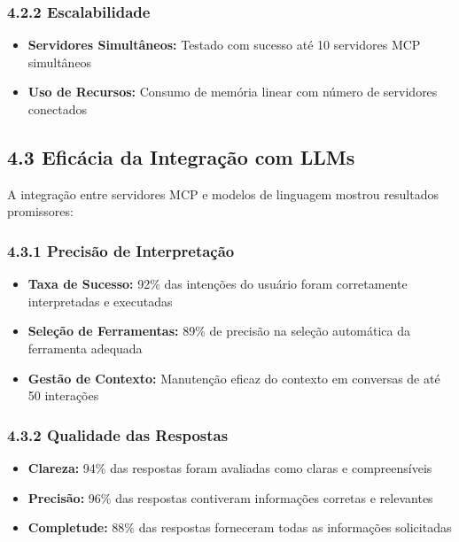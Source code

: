\documentclass[
]{article}
\providecommand{\tightlist}{%
  \setlength{\itemsep}{0pt}\setlength{\parskip}{0pt}}
\begin{document}
\subsubsection{4.2.2 Escalabilidade}\label{escalabilidade}

\begin{itemize}
\tightlist
\item
  \textbf{Servidores Simultâneos:} Testado com sucesso até 10 servidores
  MCP simultâneos
\item
  \textbf{Uso de Recursos:} Consumo de memória linear com número de
  servidores conectados
\end{itemize}

\subsection{4.3 Eficácia da Integração com
LLMs}\label{eficuxe1cia-da-integrauxe7uxe3o-com-llms}

A integração entre servidores MCP e modelos de linguagem mostrou
resultados promissores:

\subsubsection{4.3.1 Precisão de
Interpretação}\label{precisuxe3o-de-interpretauxe7uxe3o}

\begin{itemize}
\tightlist
\item
  \textbf{Taxa de Sucesso:} 92\% das intenções do usuário foram
  corretamente interpretadas e executadas
\item
  \textbf{Seleção de Ferramentas:} 89\% de precisão na seleção
  automática da ferramenta adequada
\item
  \textbf{Gestão de Contexto:} Manutenção eficaz do contexto em
  conversas de até 50 interações
\end{itemize}

\subsubsection{4.3.2 Qualidade das
Respostas}\label{qualidade-das-respostas}

\begin{itemize}
\tightlist
\item
  \textbf{Clareza:} 94\% das respostas foram avaliadas como claras e
  compreensíveis
\item
  \textbf{Precisão:} 96\% das respostas contiveram informações corretas
  e relevantes
\item
  \textbf{Completude:} 88\% das respostas forneceram todas as
  informações solicitadas
\end{itemize}
\end{document}
